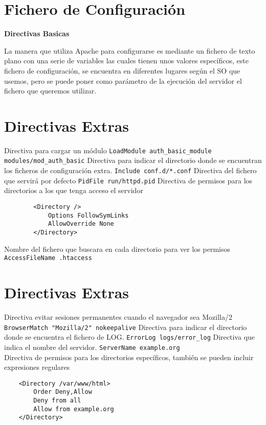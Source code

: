 \documentclass[
paper=128mm:96mm, %
fontsize=11pt, %
pagesize, %
parskip=half-, %
]{scrartcl} %
\begin{document}
\section{Fichero de Configuración \cite{apache1}}
\textbf{Directivas Basicas}
\begin{multicols}{2}
	La manera que utiliza Apache para configurarse es mediante un fichero de texto plano con una serie de variables las cuales tienen unos valores específicos, este fichero de configuración, se encuentra en diferentes lugares según el SO que usemos, pero se puede poner como parámetro de la ejecución del servidor el fichero que queremos utilizar.
	
\end{multicols}

\clearpage


\section{Directivas Extras \cite{directivas}}
\begin{multicols}{2}
	Directiva para cargar un módulo	\lstinline|LoadModule auth_basic_module modules/mod_auth_basic|
	Directiva para indicar el directorio donde se encuentran los ficheros de configuración extra. \lstinline|Include conf.d/*.conf|
	Directiva del fichero que servirá por defecto	\lstinline|PidFile run/httpd.pid|
	Directiva de permisos para los directorios a los que tenga acceso el servidor
	\begin{lstlisting}
		<Directory />
			Options FollowSymLinks
			AllowOverride None
		</Directory>	
	\end{lstlisting}
	Nombre del fichero que buscara en cada directorio para ver los permisos	\lstinline|AccessFileName .htaccess|
\end{multicols}
\clearpage


\section{Directivas Extras \cite{apache2}}
\begin{multicols}{2}
	Directiva evitar sesiones permanentes cuando el navegador sea Mozilla/2	\lstinline|BrowserMatch "Mozilla/2" nokeepalive|
	Directiva para indicar el directorio donde se encuentra el fichero de LOG. \lstinline|ErrorLog logs/error_log|
	Directiva que indica el nombre del servidor. \lstinline|ServerName example.org|\\
	Directiva de permisos para los directorios específicos, también se pueden incluir expresiones regulares
	\begin{lstlisting}
	<Directory /var/www/html>
		Order Deny,Allow
		Deny from all
		Allow from example.org
	</Directory>	
	\end{lstlisting}
\end{multicols}
\clearpage
\end{document}

